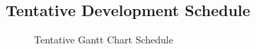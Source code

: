 \documentclass[journal,10pt,draftclsnofoot,onecolumn]{IEEEtran}
\begin{document}
\begin{singlespace}
\section{Tentative Development Schedule}
	\begin{figure}
		\centering
		\caption{Tentative Gantt Chart Schedule\label{fig:Tentative Schedule}}
	\end{figure}

\end{singlespace}
\end{document}
